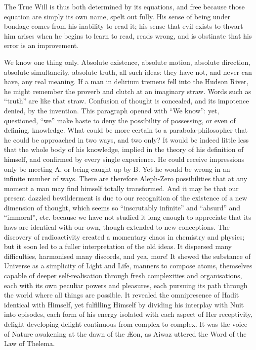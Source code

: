 The True Will is thus both determined by its equations, and free because those equation are simply its own name, spelt out fully. His sense of being under bondage comes from his inability to read it; his sense that evil exists to thwart him arises when he begins to learn to read, reads wrong, and is obstinate that his error is an improvement.

We know one thing only. Absolute existence, absolute motion, absolute direction, absolute simultaneity, absolute truth, all such ideas: they have not, and never can have, any real meaning. If a man in delirium tremens fell into the Hudson River, he might remember the proverb and clutch at an imaginary straw. Words such as \enquote{truth} are like that straw. Confusion of thought is concealed, and its impotence denied, by the invention. This paragraph opened with \enquote{We know}: yet, questioned, \enquote{we} make haste to deny the possibility of possessing, or even of defining, knowledge. What could be more certain to a parabola-philosopher that he could be approached in two ways, and two only? It would be indeed little less that the whole body of his knowledge, implied in the theory of his definition of himself, and confirmed by every single experience. He could receive impressions only be meeting A, or being caught up by B. Yet he would be wrong in an infinite number of ways. There are therefore Aleph-Zero possibilities that at any moment a man may find himself totally transformed. And it may be that our present dazzled bewilderment is due to our recognition of the existence of a new dimension of thought, which seems so \enquote{inscrutably infinite} and \enquote{absurd} and \enquote{immoral}, etc. \textemdash{} because we have not studied it long enough to appreciate that its laws are identical with our own, though extended to new conceptions. The discovery of radioactivity created a momentary chaos in chemistry and physics; but it soon led to a fuller interpretation of the old ideas. It dispersed many difficulties, harmonised many discords, and \textemdash{} yea, more! It shewed the substance of Universe as a simplicity of Light and Life, manners to compose atoms, themselves capable of deeper self-realisation through fresh complexities and organisations, each with its own peculiar powers and pleasures, each pursuing its path through the world where all things are possible. It revealed the omnipresence of Hadit identical with Himself, yet fulfilling Himself by dividing his interplay with Nuit into episodes, each form of his energy isolated with each aspect of Her receptivity, delight developing delight continuous from complex to complex. It was the voice of Nature awakening at the dawn of the \AE{}on, as Aiwaz uttered the Word of the Law of Thelema.


